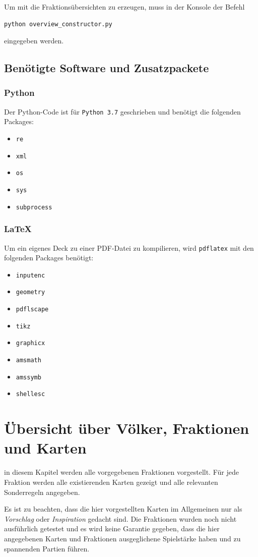 \documentclass[a4paper,11pt]{report}
\begin{document}
Um mit die Fraktionsübersichten zu erzeugen, muss in der Konsole der Befehl
\begin{lstlisting}
python overview_constructor.py
\end{lstlisting}
eingegeben werden.

\section{Benötigte Software und Zusatzpackete}
\subsection{Python}
Der Python-Code ist für \verb+Python 3.7+ geschrieben und benötigt die folgenden Packages:
\begin{itemize}
	\item \verb+re+
	\item \verb+xml+
	\item \verb+os+
	\item \verb+sys+
	\item \verb+subprocess+
\end{itemize}

\subsection{\LaTeX}
Um ein eigenes Deck zu einer PDF-Datei zu kompilieren, wird \verb+pdflatex+ mit den folgenden Packages benötigt:
\begin{itemize}
	\item \verb+inputenc+
	\item \verb+geometry+
	\item \verb+pdflscape+
	\item \verb+tikz+
	\item \verb+graphicx+
	\item \verb+amsmath+
	\item \verb+amssymb+
	\item \verb+shellesc+
\end{itemize}

\chapter{Übersicht über Völker, Fraktionen und Karten}\label{ch:uebersicht}
in diesem Kapitel werden alle vorgegebenen Fraktionen vorgestellt. Für jede Fraktion werden alle existierenden Karten gezeigt und alle relevanten Sonderregeln angegeben.

Es ist zu beachten, dass die hier vorgestellten Karten im Allgemeinen nur als \emph{Vorschlag} oder \emph{Inspiration} gedacht sind. Die Fraktionen wurden noch nicht ausführlich getestet und es wird keine Garantie gegeben, dass die hier angegebenen Karten und Fraktionen ausgeglichene Spielstärke haben und zu spannenden Partien führen.
\end{document}
